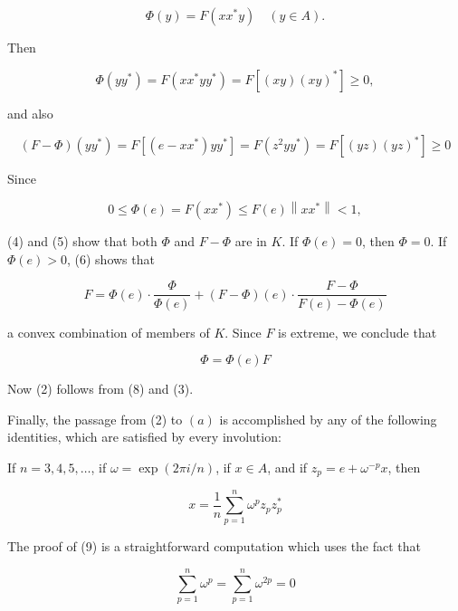 \documentclass[10pt]{article}
\begin{document}
$$
\Phi(y)=F\left(x x^{*} y\right) \quad(y \in A) .
$$

Then

$$
\Phi\left(y y^{*}\right)=F\left(x x^{*} y y^{*}\right)=F\left[(x y)(x y)^{*}\right] \geq 0,
$$

and also

$$
(F-\Phi)\left(y y^{*}\right)=F\left[\left(e-x x^{*}\right) y y^{*}\right]=F\left(z^{2} y y^{*}\right)=F\left[(y z)(y z)^{*}\right] \geq 0
$$

Since

$$
0 \leq \Phi(e)=F\left(x x^{*}\right) \leq F(e)\left\|x x^{*}\right\|<1,
$$

(4) and (5) show that both $\Phi$ and $F-\Phi$ are in $K$. If $\Phi(e)=0$, then $\Phi=0$. If $\Phi(e)>0$, (6) shows that

$$
F=\Phi(e) \cdot \frac{\Phi}{\Phi(e)}+(F-\Phi)(e) \cdot \frac{F-\Phi}{F(e)-\Phi(e)}
$$

a convex combination of members of $K$. Since $F$ is extreme, we conclude that

$$
\Phi=\Phi(e) F
$$

Now (2) follows from (8) and (3).

Finally, the passage from (2) to $(a)$ is accomplished by any of the following identities, which are satisfied by every involution:

If $n=3,4,5, \ldots$, if $\omega=\exp (2 \pi i / n)$, if $x \in A$, and if $z_{p}=e+\omega^{-p} x$, then

$$
x=\frac{1}{n} \sum_{p=1}^{n} \omega^{p} z_{p} z_{p}^{*}
$$

The proof of (9) is a straightforward computation which uses the fact that

$$
\sum_{p=1}^{n} \omega^{p}=\sum_{p=1}^{n} \omega^{2 p}=0
$$
\end{document}
